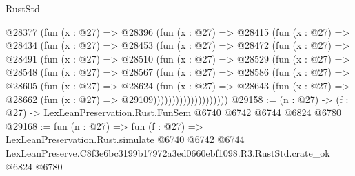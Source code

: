 \begin{lexlean}{RustStd}
\begin{coremodule}
          @28377
            (fun (x : @27) =>
            @28396
              (fun (x : @27) =>
              @28415
                (fun (x : @27) =>
                @28434
                  (fun (x : @27) =>
                  @28453
                    (fun (x : @27) =>
                    @28472
                      (fun (x : @27) =>
                      @28491
                        (fun (x : @27) =>
                        @28510
                          (fun (x : @27) =>
                          @28529
                            (fun (x : @27) =>
                            @28548
                              (fun (x : @27) =>
                              @28567
                                (fun (x : @27) =>
                                @28586
                                  (fun (x : @27) =>
                                  @28605
                                    (fun (x : @27) =>
                                    @28624
                                      (fun (x : @27) =>
                                      @28643
                                        (fun (x : @27) =>
                                        @28662 (fun (x : @27) => @29109))))))))))))))))))))
@29158 := (n : @27) -> (f : @27) -> LexLeanPreservation.Rust.FunSem @6740 @6742 @6744 @6824 @6780
@29168 := fun (n : @27) =>
  fun (f : @27) =>
  LexLeanPreservation.Rust.simulate
    @6740
    @6742
    @6744
    LexLeanPreserve.C8f3e6bc3199b17972a3ed0660ebf1098.R3.RustStd.crate_ok
    @6824
    @6780
\end{coremodule}
\end{lexlean}
